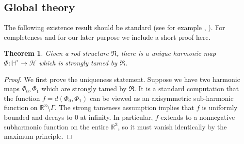 \documentclass[a4paper,11pt]{amsart}
\newtheorem{theorem}{Theorem}[section]
\theoremstyle{definition}
\numberwithin{equation}{section}
\newcommand{\dH}{\mathbb{H}}
\newcommand{\R}{\mathbb{R}}
\newcommand{\mR} {\mathfrak R}
\begin{document}
\subsection{Global theory}
\label{subsec:global regularity}



The following existence  result should be standard (see for example \cite{Weinstein}, \cite{Kunduri}). For completeness and for our later purpose we include a short proof here.
\begin{theorem}\label{t:existence result}	
Given a rod structure $\mathfrak{R}$,  there is a unique harmonic map $\Phi: \dH^\circ\rightarrow \mathcal H$ which is strongly tamed by $\mR$. 
\end{theorem}
\begin{proof}
 We first prove the uniqueness statement.  Suppose we have two  harmonic maps $\Phi_0,\Phi_1$ which are strongly tamed by $\mR$. It is a standard computation that the function $f=d(\Phi_0, \Phi_1)$ can be viewed as an axisymmetric  sub-harmonic function on $\R^3\setminus \Gamma$. The strong tameness assumption implies that $f$ is uniformly bounded and decays to $0$ at infinity. In particular, $f$ extends to a nonnegative subharmonic function on the entire $\mathbb{R}^3$, so it must vanish identically by the maximum principle. 


\end{proof}
\end{document}
